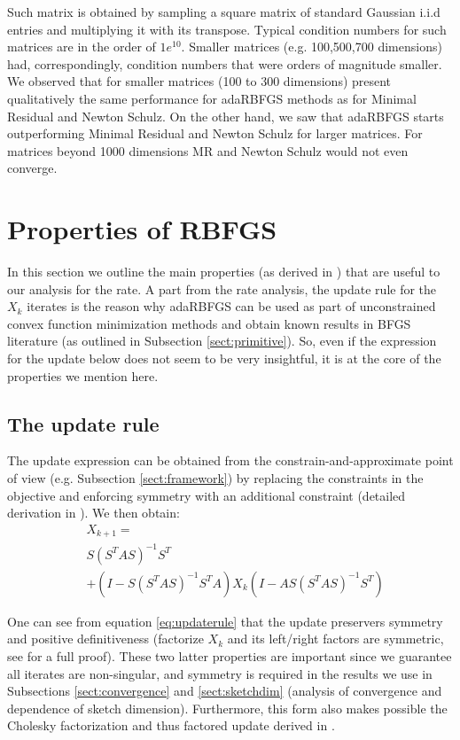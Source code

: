 \documentclass[12pt,conference,compsocconf]{IEEEtran}
\begin{document}
Such matrix is obtained by sampling a square matrix of standard Gaussian i.i.d entries and multiplying it with its transpose. Typical condition numbers for such matrices are in the order of $1e^{10}$. Smaller matrices (e.g. 100,500,700 dimensions) had, correspondingly, condition numbers that were orders of magnitude smaller. We observed that for smaller matrices (100 to 300 dimensions) present qualitatively the same performance for adaRBFGS methods as for Minimal Residual and Newton Schulz. On the other hand, we saw that adaRBFGS starts outperforming Minimal Residual and Newton Schulz for larger matrices. For matrices beyond 1000 dimensions MR and Newton Schulz would not even converge.

\section{Properties of RBFGS}\label{sect:propertiesRBFGS}
In this section we outline the main properties (as derived in \cite{Gower1}) that are useful to our analysis for the rate. A part from the rate analysis, the update rule for the $X_k$ iterates is the reason why adaRBFGS can be used as part of unconstrained convex function minimization methods and obtain known results in BFGS literature (as outlined in Subsection \ref{sect:primitive}). So, even if the expression for the update below does not seem to be very insightful, it is at the core of the properties we mention here.

\subsection{The update rule}
The update expression can be obtained from the constrain-and-approximate point of view (e.g. Subsection \ref{sect:framework}) by replacing the constraints in the objective and enforcing symmetry with an additional constraint (detailed derivation in \cite{Gower1}). We then obtain:
\begin{align}\label{eq:updaterule}
	&X_{k+1}=\\ \nonumber
    	&S(S^TAS)^{-1}S^T\\ \nonumber
	    &+ (I-S(S^TAS)^{-1}S^TA)X_k(I-AS(S^TAS)^{-1}S^T) \nonumber
\end{align}

One can see from equation \ref{eq:updaterule} that the update preservers symmetry and positive definitiveness (factorize $X_k$ and its left/right factors are symmetric, see \cite{Gower1} for a full proof). These two latter properties are important since we guarantee all iterates are non-singular, and symmetry is required in the results we use in Subsections \ref{sect:convergence} and \ref{sect:sketchdim} (analysis of convergence and dependence of sketch dimension). Furthermore, this form also makes possible the Cholesky factorization and thus factored update derived in \cite{Gratton}.
\end{document}
